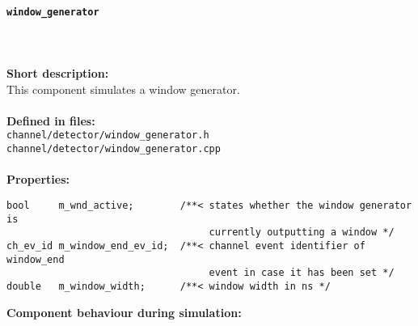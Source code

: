 \paragraph{\texttt{window\_generator}}
\label{par:comp_detector_wndgen}
\noindent \\
\\
\textbf{Short description:}\\
This component simulates a window generator.\\
\\
\textbf{Defined in files:}\\
\texttt{channel/detector/window\_generator.h}\\
\texttt{channel/detector/window\_generator.cpp}\\
\\
\textbf{Properties:}
\begin{lstlisting}
bool     m_wnd_active;        /**< states whether the window generator is
                                   currently outputting a window */
ch_ev_id m_window_end_ev_id;  /**< channel event identifier of window_end
                                   event in case it has been set */
double   m_window_width;      /**< window width in ns */
\end{lstlisting}
\noindent
\textbf{Component behaviour during simulation:}
